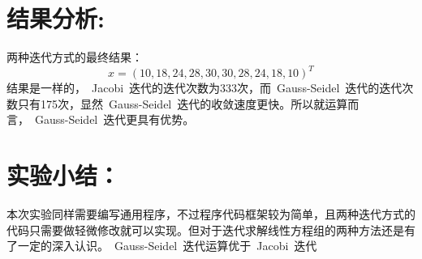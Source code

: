 \documentclass{article}
\begin{document}
	\section{结果分析:}
	两种迭代方式的最终结果：
	$$x=(10,18,24,28,30,30,28,24,18,10)^{T}$$
	结果是一样的，\ Jacobi\ 迭代的迭代次数为333次，而\ Gauss-Seidel\ 迭代的迭代次数只有175次，显然\ Gauss-Seidel\ 迭代的收敛速度更快。所以就运算而言，\ Gauss-Seidel\ 迭代更具有优势。
	\section{实验小结：}
	本次实验同样需要编写通用程序，不过程序代码框架较为简单，且两种迭代方式的代码只需要做轻微修改就可以实现。但对于迭代求解线性方程组的两种方法还是有了一定的深入认识。\ Gauss-Seidel\ 迭代运算优于\ Jacobi\ 迭代
\end{document}
